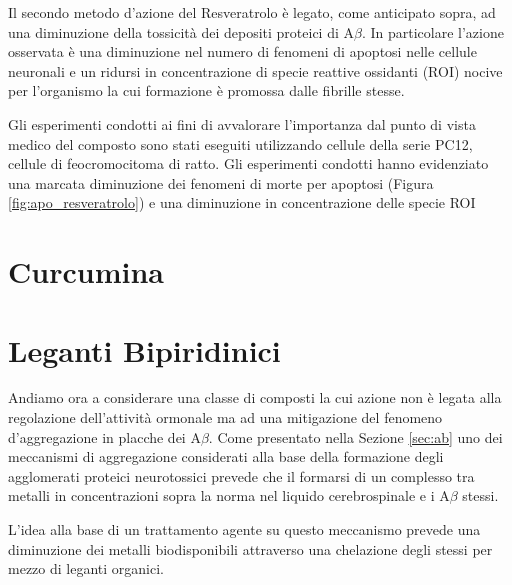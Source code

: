 \documentclass[a4paper, 12pt]{article}
\begin{document}
Il secondo metodo d'azione del Resveratrolo è legato, come anticipato sopra, ad una diminuzione della tossicità dei depositi proteici di A$\beta$. In particolare l'azione osservata è una diminuzione nel numero di fenomeni di  apoptosi nelle cellule neuronali e un ridursi in concentrazione di specie reattive ossidanti (ROI) nocive per l'organismo la cui formazione è promossa dalle fibrille stesse.

Gli esperimenti condotti ai fini di avvalorare l'importanza dal punto di vista medico del composto sono stati eseguiti utilizzando cellule della serie PC12, cellule di feocromocitoma di ratto. Gli esperimenti condotti hanno evidenziato una marcata diminuzione dei fenomeni di morte per apoptosi (Figura \ref{fig:apo_resveratrolo}) e una diminuzione in concentrazione delle specie ROI 

\section{Curcumina}
\label{sec:curc}

\section{Leganti Bipiridinici}
\label{sec:byp}
Andiamo ora a considerare una classe di composti la cui azione non è legata alla regolazione dell'attività ormonale ma ad una mitigazione del fenomeno d'aggregazione in placche dei A$\beta$. Come presentato nella Sezione \ref{sec:ab} uno dei meccanismi di aggregazione considerati alla base della formazione degli agglomerati proteici neurotossici prevede che il formarsi di un complesso tra metalli in concentrazioni sopra la norma nel liquido cerebrospinale e i A$\beta$ stessi.

L'idea alla base di un trattamento agente su questo meccanismo prevede una diminuzione dei metalli biodisponibili attraverso una chelazione degli stessi per mezzo di leganti organici.
\end{document}

